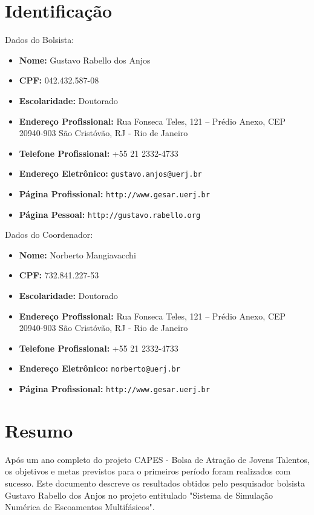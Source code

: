 \documentclass[a4paper,portuges]{article}
\begin{document}
	


\section{Identificação}

Dados do Bolsista: 
\begin{itemize}
	\item \textbf{Nome:} Gustavo Rabello dos Anjos
	\item \textbf{CPF:} 042.432.587-08
	\item \textbf{Escolaridade:} Doutorado
	\item \textbf{Endereço Profissional:} Rua Fonseca Teles, 121 --
	Prédio Anexo, CEP 20940-903 São Cristóvão, RJ - Rio de Janeiro
	\item \textbf{Telefone Profissional:} +55 21 2332-4733
	\item \textbf{Endereço Eletrônico:} {\tt gustavo.anjos@uerj.br}
	\item \textbf{Página Profissional:} {\tt http://www.gesar.uerj.br}
	\item \textbf{Página Pessoal:} {\tt http://gustavo.rabello.org}
\end{itemize}

\noindent Dados do Coordenador: 
\begin{itemize}
	\item \textbf{Nome:} Norberto Mangiavacchi
	\item \textbf{CPF:} 732.841.227-53
	\item \textbf{Escolaridade:} Doutorado
	\item \textbf{Endereço Profissional:} Rua Fonseca Teles, 121 --
	Prédio Anexo, CEP 20940-903 São Cristóvão, RJ - Rio de Janeiro
	\item \textbf{Telefone Profissional:} +55 21 2332-4733
	\item \textbf{Endereço Eletrônico:} {\tt norberto@uerj.br}
	\item \textbf{Página Profissional:} {\tt http://www.gesar.uerj.br}
\end{itemize}

\section{Resumo}
Após um ano completo do projeto CAPES - Bolsa de Atração de Jovens
Talentos, os objetivos e metas previstos para o primeiros período foram
realizados com sucesso. Este documento descreve os resultados obtidos
pelo pesquisador bolsista Gustavo Rabello dos Anjos no projeto
entitulado "Sistema de Simulação Numérica de Escoamentos Multifásicos". 
\end{document}
